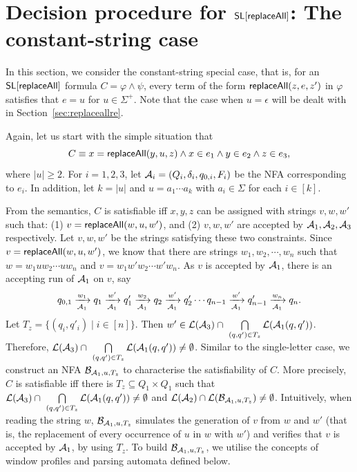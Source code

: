 
\section{Decision procedure for $\mathsf{SL}[\mathsf{replaceAll}]$: The constant-string case}\label{sec:replaceallcs}

In this section, we consider the constant-string special case, that is, for an $\mathsf{SL}[\mathsf{replaceAll}]$ formula $C = \varphi \wedge \psi$, every term of the form $\mathsf{replaceAll}(z, e, z')$ in $\varphi$ satisfies that $e=u$ for $u \in \Sigma^+$. Note that the case when $u=\epsilon$ will be dealt with in Section~\ref{sec:replaceallre}. 

Again, let us start with the simple situation that
$$C \equiv x = \mathsf{replaceAll}(y, u, z) \wedge x \in e_1 \wedge y \in e_2 \wedge z \in e_3,$$
where $|u| \ge 2$. For $i=1,2,3$, let $\mathcal{A}_i = (Q_i, \delta_i, q_{0, i}, F_i)$
be the NFA corresponding to $e_i$. In addition, let $k = |u|$ and $u = a_1 \cdots a_k$ with $a_i \in \Sigma$ for each $i \in [k]$.

From the semantics, $C$ is satisfiable iff $x, y, z$ can be assigned with  strings $v, w, w'$ such that: (1) $v = \mathsf{replaceAll}(w, u, w')$, and (2) $v,w, w'$ are accepted by $\mathcal{A}_1, \mathcal{A}_2, \mathcal{A}_3$ respectively. Let $v, w, w'$ be the strings satisfying these two constraints. Since $v = \mathsf{replaceAll}(w, u, w')$, we know that there are strings $w_1, w_2, \cdots, w_n$ such that $w= w_1 u w_2 \cdots u w_n$ and $v = w_1 w' w_2 \cdots w' w_n$. As $v$ is accepted by $\mathcal{A}_1$, there is an accepting run of $\mathcal{A}_1$ on $v$, say
$$
q_{0,1} \xrightarrow[\mathcal{A}_1]{w_1} q_1 \xrightarrow[\mathcal{A}_1]{w'} q'_1 \xrightarrow[\mathcal{A}_1]{w_2} q_2 \xrightarrow[\mathcal{A}_1]{w'} q'_2 \cdots q_{n-1} \xrightarrow[\mathcal{A}_1]{w'} q'_{n-1} \xrightarrow[\mathcal{A}_1]{w_n} q_n.
$$
Let $T_z = \{(q_i, q'_i) \mid i \in [n]\}$. Then $w' \in \mathcal{L}(\mathcal{A}_3) \cap\ \bigcap \limits_{(q,q') \in T_z} \mathcal{L}(\mathcal{A}_1(q, q'))$. Therefore, $\mathcal{L}(\mathcal{A}_3) \cap\ \bigcap \limits_{(q,q') \in T_z} \mathcal{L}(\mathcal{A}_1(q, q')) \neq \emptyset$. Similar to the single-letter case, we construct an NFA $\mathcal{B}_{\mathcal{A}_1, u, T_z}$ to characterise the satisfiability of $C$.  More precisely, $C$ is satisfiable iff there is $T_z \subseteq Q_1 \times Q_1$ such that $\mathcal{L}(\mathcal{A}_3) \cap\ \bigcap \limits_{(q,q') \in T_z} \mathcal{L}(\mathcal{A}_1(q, q')) \neq \emptyset$ and
$\mathcal{L}(\mathcal{A}_2) \cap \mathcal{L}(\mathcal{B}_{\mathcal{A}_1, u, T_z}) \neq \emptyset$. Intuitively, when reading the string $w$, $\mathcal{B}_{\mathcal{A}_1, u, T_z}$ simulates the generation of $v$ from $w$ and $w'$ (that is, the replacement of  every occurrence of $u$ in $w$ with $w'$) and verifies that $v$ is accepted by $\mathcal{A}_1$, by using $T_z$.
To build $\mathcal{B}_{\mathcal{A}_1, u, T_z}$, we utilise the concepts of window profiles and parsing automata defined below.
%


